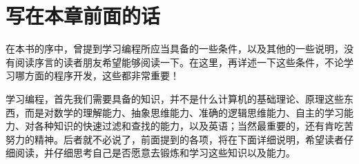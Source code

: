 \section{写在本章前面的话}

在本书的序中，曾提到学习编程所应当具备的一些条件，以及其他的一些说明，没有阅读序言的读者朋友希望能够阅读一下。在这里，再详述一下这些条件，不论学习哪方面的程序开发，这些都非常重要！

学习编程，首先我们需要具备的知识，并不是什么计算机的基础理论、原理这些东西，而是对数学的理解能力、抽象思维能力、准确的逻辑思维能力、自主的学习能力、对各种知识的快速过滤和查找的能力，以及英语；当然最重要的，还有肯吃苦努力的精神。后者就不必说了，前面提到的各项，将在下面详细说明，希望读者仔细阅读，并仔细思考自己是否愿意去锻炼和学习这些知识以及能力。


